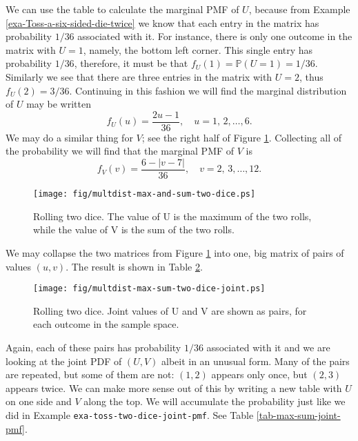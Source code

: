 We can use the table to calculate the marginal PMF of \(U\), because
from Example \ref{exa-Toss-a-six-sided-die-twice} we know that each entry in
the matrix has probability \(1/36\) associated with it. For instance,
there is only one outcome in the matrix with \(U=1\), namely, the
bottom left corner. This single entry has probability \(1/36\),
therefore, it must be that
\(f_{U}(1)=\mathbb{P}(U=1)=1/36\). Similarly we see that there are
three entries in the matrix with \(U=2\), thus
\(f_{U}(2)=3/36\). Continuing in this fashion we will find the
marginal distribution of \(U\) may be written
\begin{equation}
f_{U}(u)=\frac{2u-1}{36},\quad u=1,\,2,\ldots,6.
\end{equation}
We may do a similar thing for \(V\); see the right half of Figure
\ref{fig-max-and-sum-two-dice}. Collecting all of the probability we will find that
the marginal PMF of \(V\) is
\begin{equation}
f_{V}(v)=\frac{6-|v-7|}{36},\quad v=2,\,3,\ldots,12.
\end{equation}

\begin{figure}[ht!]
\centering
\texttt{[image: fig/multdist-max-and-sum-two-dice.ps]}
\caption[Max and Sum of two dice]{\label{fig-max-and-sum-two-dice}\small Rolling two dice. The value of U is the maximum of the two rolls, while the value of V is the sum of the two rolls.}
\end{figure}

We may collapse the two matrices from Figure \ref{fig-max-and-sum-two-dice} into
one, big matrix of pairs of values \((u,v)\). The result is shown in
Table \ref{fig-max-sum-two-dice-joint}.

\begin{figure}[ht!]
\centering
\texttt{[image: fig/multdist-max-sum-two-dice-joint.ps]}
\caption[Joint outcomes of Max and Sum]{\label{fig-max-sum-two-dice-joint}\small Rolling two dice. Joint values of U and V are shown as pairs, for each outcome in the sample space.}
\end{figure}

Again, each of these pairs has probability \(1/36\) associated with it
and we are looking at the joint PDF of \((U,V)\) albeit in an unusual
form. Many of the pairs are repeated, but some of them are not:
\((1,2)\) appears only once, but \((2,3)\) appears twice. We can make
more sense out of this by writing a new table with \(U\) on one side
and \(V\) along the top. We will accumulate the probability just like
we did in Example \texttt{exa-toss-two-dice-joint-pmf}. See Table \ref{tab-max-sum-joint-pmf}.

